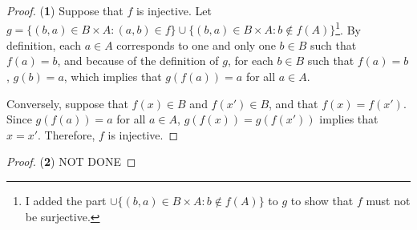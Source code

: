 \begin{proof}(\textbf{1})
	Suppose that $f$ is injective. Let $g = \{(b,a)\in B\times A:(a,b)\in f\}\cup\{(b,a)\in B\times A:b\notin f(A)\}$\footnote{I added the part $\cup\{(b,a)\in B\times A:b\notin f(A)\}$ to $g$ to show that $f$ must not be surjective.}. By definition, each $a\in A$ corresponds to one and only one $b\in B$ such that $f(a)=b$, and because of the definition of $g$, for each $b\in B$ such that $f(a)=b$, $g(b)=a$, which implies that $g(f(a))=a$ for all $a\in A$. 
	
	Conversely, suppose that $f(x)\in B$ and $f(x')\in B$, and that $f(x)=f(x')$. Since $g(f(a))=a$ for all $a\in A$, $g(f(x))=g(f(x'))$ implies that $x=x'$. Therefore, $f$ is injective.
\end{proof}

\begin{proof}(\textbf{2})
	NOT DONE
\end{proof}





























